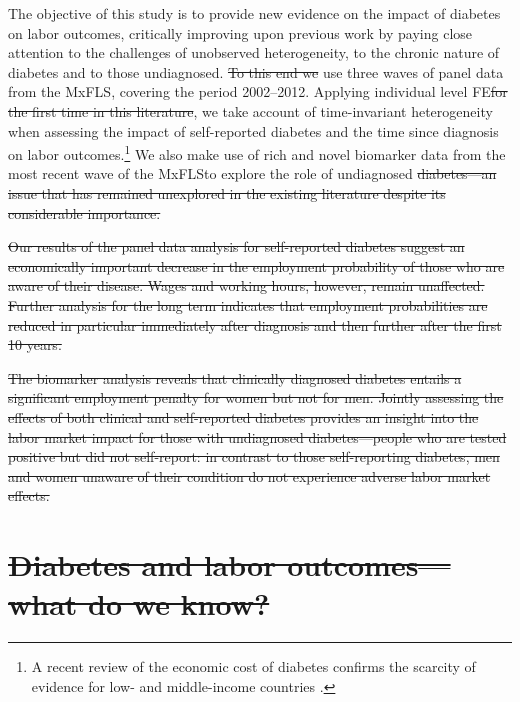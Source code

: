 \documentclass[12pt,english]{article}
\providecommand{\DIFaddtex}[1]{{\protect\color{blue}\uwave{#1}}} %
\providecommand{\DIFdeltex}[1]{{\protect\color{red}\sout{#1}}}                      %
\providecommand{\DIFaddbegin}{} %
\providecommand{\DIFaddend}{} %
\providecommand{\DIFdelbegin}{} %
\providecommand{\DIFdelend}{} %
\providecommand{\DIFadd}[1]{\texorpdfstring{\DIFaddtex{#1}}{#1}} %
\providecommand{\DIFdel}[1]{\texorpdfstring{\DIFdeltex{#1}}{}} %
\begin{document}
The objective of this study is to provide new evidence on the impact of diabetes on labor outcomes, critically improving upon previous work by paying close attention to the challenges of unobserved heterogeneity, to the chronic nature of diabetes and to those undiagnosed. \DIFdelbegin \DIFdel{To this end we }\DIFdelend \DIFaddbegin \DIFadd{We }\DIFaddend use three waves of panel data from the \acf{MxFLS}, covering the period 2002--2012. Applying individual level \acf{FE}\DIFdelbegin \DIFdel{for the first time in this literature}\DIFdelend , we take account of time-invariant heterogeneity when assessing the impact of self-reported diabetes and the time since diagnosis on labor outcomes.\footnote{A recent review of the economic cost of diabetes confirms the scarcity of evidence for low- and middle-income countries \parencite{Seuring2015a}.} We also make use of rich and novel biomarker data from the most recent wave of the \ac{MxFLS}\DIFaddbegin \DIFadd{, }\DIFaddend to explore the role of undiagnosed \DIFdelbegin \DIFdel{diabetes---an issue that has remained unexplored in the existing literature despite its considerable importance.
}%

\DIFdel{Our results of the panel data analysis for self-reported diabetes suggest an economically important decrease in the employment probability of those who are aware of their disease. Wages and working hours, however, remain unaffected. Further analysis for the long term indicates that employment probabilities are reduced in particular immediately after diagnosis and then further after the first 10 years.
}%

\DIFdel{The biomarker analysis reveals that clinically diagnosed diabetes entails a significant employment penalty for women but not for men. Jointly assessing the effects of both clinical and self-reported diabetes provides an insight into the labor market impact for those with undiagnosed diabetes---people who are tested positive but did not self-report: in contrast to those self-reporting diabetes, men and women unaware of their condition do not experience adverse labor market effects.	 
}%

\section{%
\DIFdel{Diabetes and labor outcomes---what do we know?}}
\addtocounter{section}{-1}%
\end{document}
